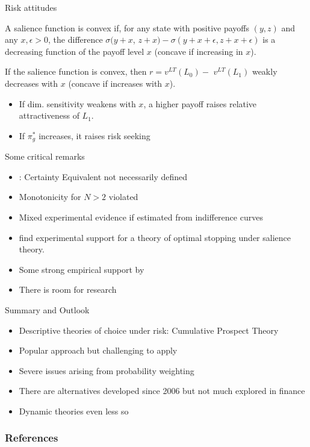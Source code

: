 \begin{frame}{Risk attitudes}
    \begin{definition}
        A salience function is convex if, for any state with positive payoffs $(y, z)$ and any $x, \epsilon>0$, the difference $\sigma(y+x$, $z+x)-\sigma(y+x+\epsilon, z+x+\epsilon)$ is a decreasing function of the payoff level $x$ (concave if increasing in $x$).
    \end{definition}
    \begin{Lemma}
        If the salience function is convex, then $r=v^{L T}\left(L_0\right)-$ $v^{L T}\left(L_1\right)$ weakly decreases with $x$   (concave if increases with $x$).
    \end{Lemma}
   \begin{itemize}
   \item If dim. sensitivity weakens with $x$, a higher payoff raises relative attractiveness of  $L_1$.\medskip
   \item If $\pi_g^* $ increases, it raises risk seeking
    \end{itemize}
\end{frame}

\begin{frame}{Some critical remarks}
    \begin{itemize}
        \item \citet{Kontek2016}: Certainty Equivalent not necessarily defined\medskip
        \item Monotonicity for $N>2$ violated\medskip
        \item Mixed experimental evidence if estimated from indifference curves\medskip
	\item \citet{Dertwinkel-KaltFrey2023} find experimental support for a theory of optimal stopping under salience theory.\medskip
        \item Some strong empirical support by \citet{CosemansFrehen2021}\medskip
        \item There is room for research\medskip
	\end{itemize}
\end{frame}

\begin{frame}{Summary and Outlook}
\begin{itemize}
\item Descriptive theories of choice under risk: Cumulative Prospect Theory\medskip
\item Popular approach but challenging to apply\medskip
\item Severe issues arising from probability weighting\medskip
\item There are alternatives developed since 2006 but not much explored in finance\medskip
\item Dynamic theories even less so\medskip
\end{itemize}
\end{frame}


\begin{frame}[allowframebreaks]
    \frametitle{References}
    \renewcommand{\bibfont}{\normalfont\footnotesize}
    \printbibliography
\end{frame}


